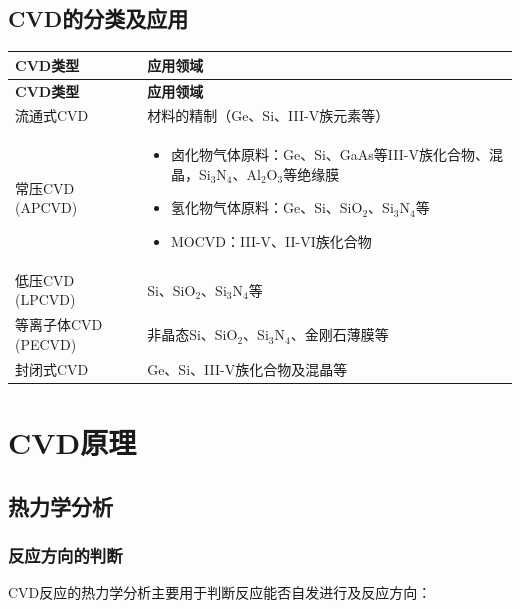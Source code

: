 \documentclass[UTF8,12pt,a4paper]{ctexart}
\begin{document}
\subsection{CVD的分类及应用}

\begin{longtable}{|L{3cm}|L{12cm}|}
\hline
\textbf{CVD类型} & \textbf{应用领域} \\
\hline
\endfirsthead
\hline
\textbf{CVD类型} & \textbf{应用领域} \\
\hline
\endhead
\hline
\endfoot
\hline
\endlastfoot

流通式CVD & 材料的精制（Ge、Si、III-V族元素等） \\
\hline

常压CVD (APCVD) & 
\begin{itemize}[leftmargin=*,nosep]
    \item 卤化物气体原料：Ge、Si、GaAs等III-V族化合物、混晶，Si$_3$N$_4$、Al$_2$O$_3$等绝缘膜
    \item 氢化物气体原料：Ge、Si、SiO$_2$、Si$_3$N$_4$等
    \item MOCVD：III-V、II-VI族化合物
\end{itemize} \\
\hline

低压CVD (LPCVD) & Si、SiO$_2$、Si$_3$N$_4$等 \\
\hline

等离子体CVD (PECVD) & 非晶态Si、SiO$_2$、Si$_3$N$_4$、金刚石薄膜等 \\
\hline

封闭式CVD & Ge、Si、III-V族化合物及混晶等 \\
\hline

\end{longtable}

\newpage

\section{CVD原理}

\subsection{热力学分析}

\subsubsection{反应方向的判断}

CVD反应的热力学分析主要用于判断反应能否自发进行及反应方向：
\end{document}
